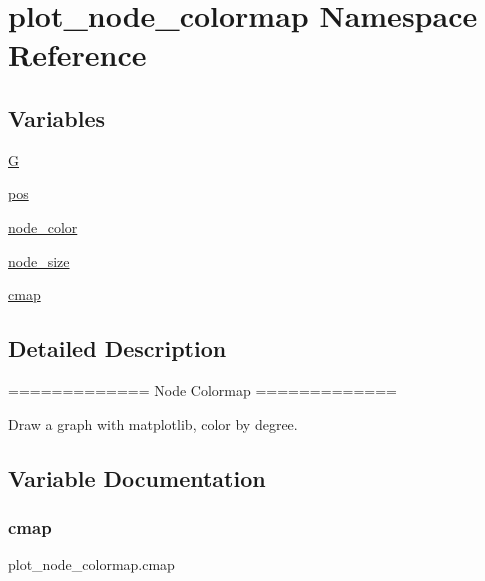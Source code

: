 \hypertarget{namespaceplot__node__colormap}{}\section{plot\+\_\+node\+\_\+colormap Namespace Reference}
\label{namespaceplot__node__colormap}
\subsection*{Variables}
\begin{DoxyCompactItemize}
\item 
\hyperlink{namespaceplot__node__colormap_a8a60e48dfdbb9a2d0c7bd7668a884296}{G}
\item 
\hyperlink{namespaceplot__node__colormap_ac04202b6718f7a2e5136baed6980410d}{pos}
\item 
\hyperlink{namespaceplot__node__colormap_a1a9b3d6738f5365de1ffc10937d3bdb6}{node\+\_\+color}
\item 
\hyperlink{namespaceplot__node__colormap_acdcb6307571a0c6ad89a4887b2ecc14b}{node\+\_\+size}
\item 
\hyperlink{namespaceplot__node__colormap_a0b5dd94d0df67f4108877fed69982fd6}{cmap}
\end{DoxyCompactItemize}


\subsection{Detailed Description}
\begin{DoxyVerb}=============
Node Colormap
=============

Draw a graph with matplotlib, color by degree.
\end{DoxyVerb}
 

\subsection{Variable Documentation}
\mbox{\label{namespaceplot__node__colormap_a0b5dd94d0df67f4108877fed69982fd6}} 
\subsubsection{\texorpdfstring{cmap}{cmap}}
{\footnotesize\ttfamily plot\+\_\+node\+\_\+colormap.\+cmap}

